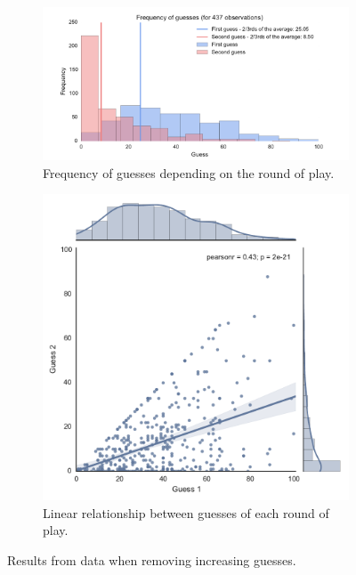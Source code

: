 \documentclass{article}
\begin{document}
\begin{figure}[!hbtp]
    \begin{subfigure}{.6\textwidth}
        \centering
        \includegraphics[width=\textwidth]{../data/histogram_of_guesses_removing_increasing_guesses.pdf}
        \caption{Frequency of guesses depending on the round of play.}
        \label{fig:histogram_of_guess}
    \end{subfigure}
    \begin{subfigure}{.4\textwidth}
        \centering
        \includegraphics[width=\textwidth]{../data/jointplot_of_guesses_removing_increasing_guesses.pdf}
        \caption{Linear relationship between guesses of each round of play.}
        \label{fig:jointplot_of_guess}
    \end{subfigure}
    \caption{Results from data when removing increasing guesses.}
    \label{fig:results_with_decreasing_guess}
\end{figure}
\end{document}
